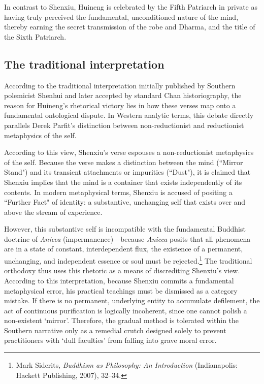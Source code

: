 \noindent In contrast to Shenxiu, Huineng is celebrated by the Fifth Patriarch in
private as having truly perceived the fundamental, unconditioned nature
of the mind, thereby earning the secret transmission of the robe and
Dharma, and the title of the Sixth Patriarch.

\subsection{The traditional interpretation}

According to the traditional interpretation initially published by
Southern polemicist Shenhui and later accepted by standard Chan
historiography, the reason for Huineng's rhetorical victory lies in how
these verses map onto a fundamental ontological dispute. In Western
analytic terms, this debate directly parallels Derek Parfit's
distinction between non-reductionist and reductionist metaphysics of the
self.

According to this view, Shenxiu's verse espouses a non-reductionist
metaphysics of the self. Because the verse makes a distinction between
the mind (``Mirror Stand") and its transient attachments or impurities
(``Dust"), it is claimed that Shenxiu implies that the mind is a
container that exists independently of its contents. In modern
metaphysical terms, Shenxiu is accused of positing a ``Further Fact" of
identity: a substantive, unchanging self that exists over and above the
stream of experience.

However, this substantive self is incompatible with the fundamental
Buddhist doctrine of \emph{Anicca} (impermanence)---because
\emph{Anicca} posits that all phenomena are in a state of constant,
interdependent flux, the existence of a permanent, unchanging, and
independent essence or soul must be rejected.\footnote{Mark Siderits,
  \emph{Buddhism as Philosophy: An Introduction} (Indianapolis: Hackett
  Publishing, 2007), 32--34.} The traditional orthodoxy thus uses this
rhetoric as a means of discrediting Shenxiu's view. According to this
interpretation, because Shenxiu commits a fundamental metaphysical
error, his practical teachings must be dismissed as a category mistake.
If there is no permanent, underlying entity to accumulate defilement,
the act of continuous purification is logically incoherent, since one
cannot polish a non-existent `mirror'. Therefore, the gradual method is
tolerated within the Southern narrative only as a remedial crutch
designed solely to prevent practitioners with `dull faculties' from
falling into grave moral error.

